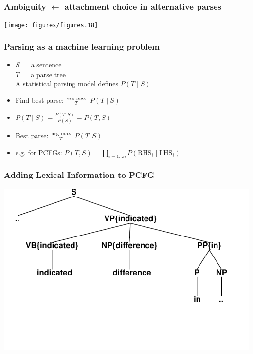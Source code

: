 \begin{frame}[fragile]
\frametitle{Ambiguity $\leftarrow$ attachment choice in alternative parses}
\texttt{[image: figures/figures.18]}
\end{frame}

\begin{frame}
\frametitle{Parsing as a machine learning problem}
\begin{itemize}
\item<1-> $S = $ a sentence \\
      $T = $ a parse tree \\
A statistical parsing model defines $P(T \mid S)$
\item<2-> Find best parse: $\textrm{arg max}\atop{T}$ $P(T \mid S)$
\item<3-> $P(T \mid S) = \frac{P(T, S)}{P(S)} = P(T,S)$
\item<4-> Best parse: $\textrm{arg max}\atop{T}$ $P(T, S)$
\item<5-> e.g. for PCFGs: $P(T, S) = \prod_{i=1 \ldots n} P(\textrm{RHS}_i \mid \textrm{LHS}_i)$
\end{itemize}

\end{frame}

\newcommand{\code}[1]{\mbox{\tt #1}}

\begin{frame}
\frametitle{Adding Lexical Information to PCFG}
\centering
\includegraphics[scale=.7]{figures/bilexicalcfg0}
\end{frame}

